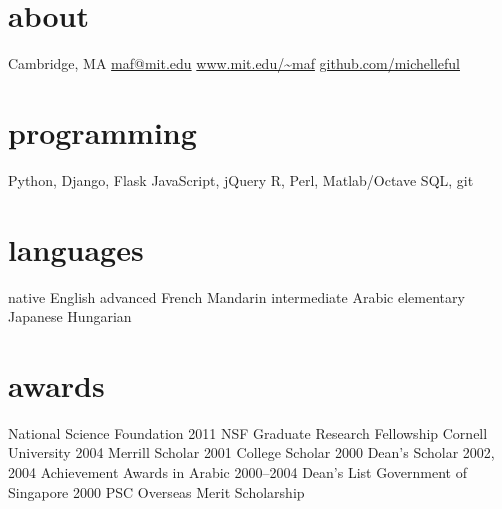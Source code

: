 \documentclass[]{friggeri-cv}
\begin{document}


\begin{aside}
  \section{about}
	Cambridge, MA
    \href{mailto:maf@mit.edu}{maf@mit.edu}
    \href{http://www.mit.edu/~maf}{www.mit.edu/\textasciitilde maf}
    \href{http://github.com/michelleful}{github.com/michelleful}
  \section{programming}
    Python, Django, Flask
    JavaScript, jQuery
	R, Perl, Matlab/Octave
	SQL, git
  \section{languages}
	{\footnotesize{}native} English
	{\footnotesize{}advanced} French
	         Mandarin
	{\footnotesize{}intermediate} Arabic
	{\footnotesize{}elementary} Japanese
	           Hungarian
  \section{awards}
    {\footnotesize{}National Science Foundation}
    {\footnotesize{}2011} NSF Graduate Research Fellowship
    {\footnotesize{}Cornell University} 
    {\footnotesize{}2004} Merrill Scholar
    {\footnotesize{}2001} College Scholar
    {\footnotesize{}2000} Dean's Scholar
    {\footnotesize{}2002, 2004} Achievement Awards in Arabic
    {\footnotesize{}2000--2004} Dean's List
    {\footnotesize{}Government of Singapore}
    {\footnotesize{}2000} PSC Overseas Merit Scholarship 
\end{aside}
\end{document}
